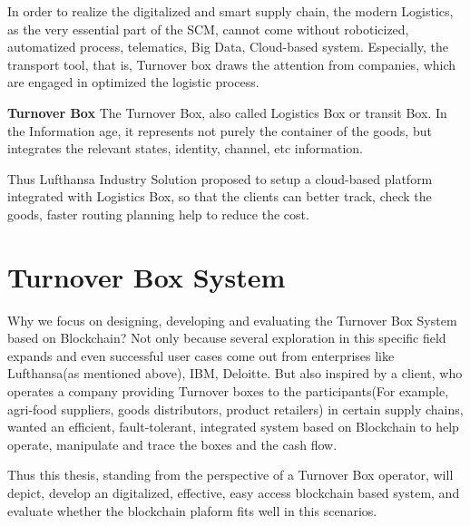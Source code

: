 In order to realize the digitalized and smart supply chain, the modern Logistics, as the very essential part of the SCM, cannot come without roboticized, automatized process, telematics, Big Data, Cloud-based system.  Especially, the transport tool, that is, Turnover box draws the attention from companies, which are engaged in optimized the logistic process.

\textbf{Turnover Box}
The Turnover Box, also called Logistics Box or transit Box. In the Information age, it represents not purely the container of the goods, but integrates the relevant states, identity, channel, etc information.  

Thus Lufthansa Industry Solution proposed to setup a cloud-based platform integrated with Logistics Box, so that the clients can better track, check the goods, faster routing planning help to reduce the cost.

\section{Turnover Box System}
Why we focus on designing, developing and evaluating the Turnover Box System based on Blockchain? Not only because several exploration in this specific field expands and even successful user cases come out from enterprises like Lufthansa(as mentioned above), IBM, Deloitte. But also inspired by a client, who operates a company providing Turnover boxes to the participants(For example, agri-food suppliers, goods distributors, product retailers) in certain supply chains, wanted an efficient, fault-tolerant, integrated system based on Blockchain to help operate, manipulate and trace the boxes and the cash flow. 

Thus this thesis, standing from the perspective of a Turnover Box operator, will depict, develop an digitalized, effective, easy access blockchain based system, and evaluate whether the blockchain plaform fits well in this scenarios.

